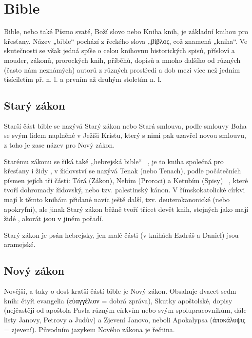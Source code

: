 \documentclass[a4rpaper,11pt,oneside]{article}
\begin{document}


\section{Bible}

Bible, nebo také Písmo svaté, Boží slovo nebo Kniha knih, je základní knihou pro křesťany. Název „bible“ pochází z řeckého slova „\textgreek{βἰβλος}, což znamená „kniha“. Ve skutečnosti se však jedná spíše o celou knihovnu historických spisů, přísloví a mouder, zákonů, prorockých knih, příběhů, dopisů a mnoho dalšího od různých (často nám neznámých) autorů z různých prostředí a dob mezi více než jedním tisíciletím př. n. l. a prvním až druhým stoletím n. l.

\subsection{Starý zákon}

Starší část bible se nazývá Starý zákon nebo Stará smlouva, podle smlouvy Boha se svým lidem naplněné v Ježíši Kristu, který s nimi pak uzavřel novou smlouvu, z toho je zase název pro Nový zákon.

Starému zákonu se říká také „hebrejská bible“ ~\cite{online-bible}, je to kniha společná pro křesťany  i židy , v židovství se nazývá Tenak (nebo Tenach), podle počátečních písmen jejích tří částí: Tórá (Zákon), Nebím (Proroci) a Ketubím (Spisy) ~\cite[strana 17]{cep},  které tvoří dohromady židovský, nebo tzv. palestinský kánon. V římskokatolické církvi  mají k těmto knihám přidané navíc ještě další, tzv. deuterokanonické (nebo apokryfní), ale jinak Starý zákon běžně tvoří třicet devět knih, stejných jako mají židé , akorát jsou v jiném pořadí.

Starý zákon je psán hebrejsky, jen malé části (v knihách Ezdráš a Daniel) jsou aramejské.

\subsection{Nový zákon}

Novější, a taky o dost kratší částí bible je Nový zákon. Obsahuje dvacet sedm knih: čtyři evangelia (\textgreek{εὐαγγέλιον} = dobrá zpráva), Skutky apoštolské, dopisy (nejčastěji od apoštola Pavla různým církvím nebo svým spolupracovníkům, dále listy Janovy, Petrovy a Judův) a Zjevení Janovo, neboli Apokalypsa (\textgreek{ἀποκάλυψις} = zjevení). Původním jazykem Nového zákona je řečtina.
\end{document}
